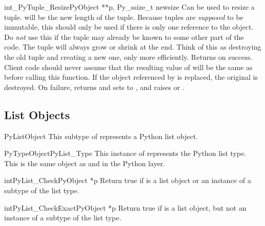 \begin{cfuncdesc}{int}{_PyTuple_Resize}{PyObject **p, Py_ssize_t newsize}
  Can be used to resize a tuple.   will be the new length
  of the tuple.  Because tuples are \emph{supposed} to be immutable,
  this should only be used if there is only one reference to the
  object.  Do \emph{not} use this if the tuple may already be known to
  some other part of the code.  The tuple will always grow or shrink
  at the end.  Think of this as destroying the old tuple and creating
  a new one, only more efficiently.  Returns  on success.
  Client code should never assume that the resulting value of
   will be the same as before calling this function.
  If the object referenced by  is replaced, the
  original  is destroyed.  On failure, returns
   and sets  to \NULL{}, and raises
   or
  .
\end{cfuncdesc}


\subsection{List Objects \label{listObjects}}

\begin{ctypedesc}{PyListObject}
  This subtype of  represents a Python list object.
\end{ctypedesc}

\begin{cvardesc}{PyTypeObject}{PyList_Type}
  This instance of  represents the Python list
  type.  This is the same object as  and 
  in the Python layer.
\end{cvardesc}

\begin{cfuncdesc}{int}{PyList_Check}{PyObject *p}
  Return true if  is a list object or an instance of a
  subtype of the list type.
\end{cfuncdesc}

\begin{cfuncdesc}{int}{PyList_CheckExact}{PyObject *p}
  Return true if  is a list object, but not an instance of a
  subtype of the list type.
\end{cfuncdesc}

